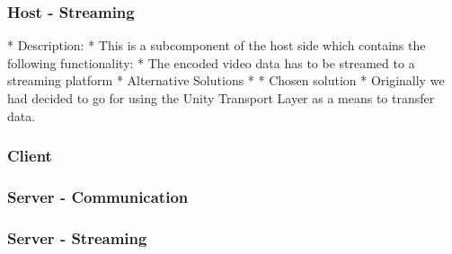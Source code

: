 \subsubsection{Host - Streaming} %
* Description:
    * This is a subcomponent of the host side which contains the following functionality: 
        * The encoded video data has to be streamed to a streaming platform
* Alternative Solutions
    * 
* Chosen solution
    * Originally we had decided to go for using the Unity Transport Layer as a means to transfer data. 


\subsubsection{Client} %

\subsubsection{Server - Communication} %

\subsubsection{Server - Streaming} %


